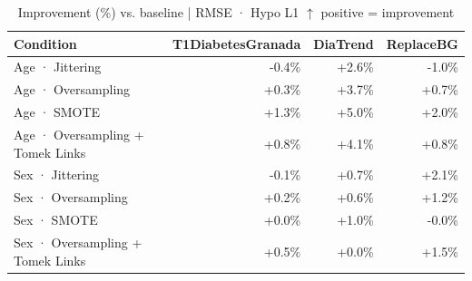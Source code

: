 \begin{table}[htbp]
\centering
\small
\caption{Improvement (\%) vs. baseline  |  RMSE · Hypo L1  $\uparrow$ positive = improvement}
\label{tab:delta_rmse_tbr_1_family_size_oversampling}
\begin{tabular}{lrrr}
\toprule
\textbf{Condition} & \textbf{T1DiabetesGranada} & \textbf{DiaTrend} & \textbf{ReplaceBG} \\
\midrule
Age · Jittering & \textcolor{BrickRed}{-0.4\%} & \textcolor{OliveGreen}{+2.6\%} & \textcolor{BrickRed}{-1.0\%} \\
Age · Oversampling & \textcolor{OliveGreen}{+0.3\%} & \textcolor{OliveGreen}{+3.7\%} & \textcolor{OliveGreen}{+0.7\%} \\
Age · SMOTE & \textcolor{OliveGreen}{+1.3\%} & \textcolor{OliveGreen}{+5.0\%} & \textcolor{OliveGreen}{+2.0\%} \\
Age · Oversampling + Tomek Links & \textcolor{OliveGreen}{+0.8\%} & \textcolor{OliveGreen}{+4.1\%} & \textcolor{OliveGreen}{+0.8\%} \\
\midrule
Sex · Jittering & \textcolor{BrickRed}{-0.1\%} & \textcolor{OliveGreen}{+0.7\%} & \textcolor{OliveGreen}{+2.1\%} \\
Sex · Oversampling & \textcolor{OliveGreen}{+0.2\%} & \textcolor{OliveGreen}{+0.6\%} & \textcolor{OliveGreen}{+1.2\%} \\
Sex · SMOTE & \textcolor{OliveGreen}{+0.0\%} & \textcolor{OliveGreen}{+1.0\%} & \textcolor{BrickRed}{-0.0\%} \\
Sex · Oversampling + Tomek Links & \textcolor{OliveGreen}{+0.5\%} & \textcolor{OliveGreen}{+0.0\%} & \textcolor{OliveGreen}{+1.5\%} \\
\bottomrule
\end{tabular}
\end{table}